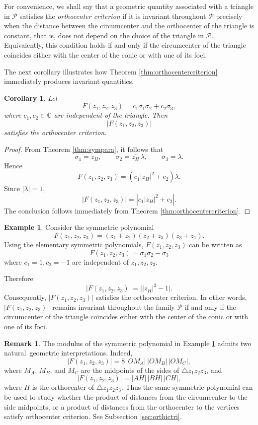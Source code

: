 \documentclass[11pt,reqno]{amsart}
\newtheorem{corollary}{Corollary}[section]
\theoremstyle{definition}
\newtheorem{example}{Example}[section]
\newtheorem{remark}{Remark}[section]
\numberwithin{equation}{section}
\begin{document}
For convenience, we shall say that a geometric quantity associated with a triangle in $\mathcal P$ satisfies the \emph{orthocenter criterion} if it is invariant throughout $\mathcal P$ precisely when the distance between the circumcenter and the orthocenter of the triangle is constant, that is, does not depend on the choice of the triangle in $\mathcal P$. Equivalently, this condition holds if and only if the circumcenter of the triangle coincides either with the center of the conic or with one of its foci.

The next corollary illustrates how Theorem \ref{thm:orthocentercriterion} immediately produces invariant quantities.

\begin{corollary}
Let
\[
F(z_1,z_2,z_3)
=
c_1\sigma_1\sigma_2+c_2\sigma_3,
\]
where $c_1,c_2\in\mathbb C$ are independent of the triangle. Then
\[
|F(z_1,z_2,z_3)|
\]
satisfies the orthocenter criterion.
\end{corollary}

\begin{proof}
From Theorem \ref{thm:sympara}, it follows that
\begin{equation}\label{eq:sigma1sigma2}
\sigma_1=z_H, \qquad    \sigma_2=\overline{z_H}\,\lambda,
\qquad
\sigma_3=\lambda.
\end{equation}
Hence
\[
F(z_1,z_2,z_3)
=
\left(c_1|z_H|^2+c_2\right)\lambda.
\]
Since $|\lambda|=1$,
\[
|F(z_1,z_2,z_3)|
=
\left|c_1|z_H|^2+c_2\right|.
\]
The conclusion follows immediately from Theorem \ref{thm:orthocentercriterion}.
\end{proof}

\begin{example}\label{ex:sympol}
Consider the symmetric polynomial
\[
F(z_1,z_2,z_3)
=
(z_1+z_2)(z_2+z_3)(z_3+z_1).
\]
Using the elementary symmetric polynomials, $F(z_1,z_2,z_3)$ can be written as 
\[
F(z_1,z_2,z_3)
=
\sigma_1\sigma_2-\sigma_3
\]
where $c_1=1, c_2=-1$ are independent of $z_1,z_2,z_3$. 

Therefore
\[
|F(z_1,z_2,z_3)|
=
\bigl||z_H|^2-1\bigr|.
\]
Consequently, $|F(z_1,z_2,z_3)|$ satisfies the orthocenter criterion. In other words, $|F(z_1,z_2,z_3)|$ \,remains invariant throughout the family $\mathcal P$ if and only if the circumcenter of the triangle coincides either with the center of the conic or with one of its foci.
\end{example}

\begin{remark}
    The modulus of the symmetric polynomial in Example \ref{ex:sympol} admits two natural \,geometric interpretations. Indeed,
\[
|F(z_1,z_2,z_3)|
=
8\,|OM_A|\,|OM_B|\,|OM_C|,
\]
where $M_A$, $M_B$, and $M_C$ are the midpoints of the sides of $\triangle z_1z_2z_3$, and
\[
|F(z_1,z_2,z_3)|
=
|AH|\,|BH|\,|CH|,
\]
where $H$ is the orthocenter of $\triangle z_1z_2z_3$. Thus the same symmetric polynomial can be used to study whether the product of distances from the circumcenter to the side midpoints, or a product of distances from the orthocenter to the vertices satisfy orthocenter criterion. See Subsection \ref{sec:orthictri}.
\end{remark}
\end{document}
